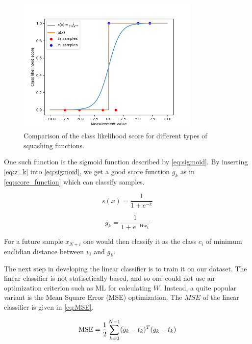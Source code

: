 \documentclass{article}
\begin{document}
\begin{figure}
    \centering
    \includegraphics[width=0.8\textwidth]{../images/squashing_functions.png}
    \caption{Comparison of the class likelihood score for different types of squashing functions.}
    \label{fig:squashing_functions}
\end{figure}

One such function is the sigmoid function described by \eqref{eq:sigmoid}. By inserting \eqref{eq:z_k}
into \eqref{eq:sigmoid}, we get a good score function $g_k$ as in \eqref{eq:score_function}
which can classify samples.

\begin{equation}
    s(x) = \frac{1}{1 + e^{-x}} \label{eq:sigmoid}
\end{equation}

\begin{equation}
    g_k = \frac{1}{1 + e^{-Wx_k}} \label{eq:score_function}
\end{equation}

For a future sample $x_{N+i}$ one would then classify it as the class $c_i$ of minimum euclidian
distance between $v_i$ and $g_k$.

The next step in developing the linear classifier is to train it on our dataset.
The linear classifier is not statisctically based, and so one could not use an optimization
criterion such as ML for calculating $W$. Instead, a quite popular variant is the Mean Square
Error (MSE) optimization. The $MSE$ of the linear classifier is given in \eqref{eq:MSE}.

\begin{equation}
    \textnormal{MSE} = \frac{1}{2} \sum_{k=0}^{N-1} (g_k - t_k)^T(g_k - t_k) \label{eq:MSE}
\end{equation}
\end{document}
